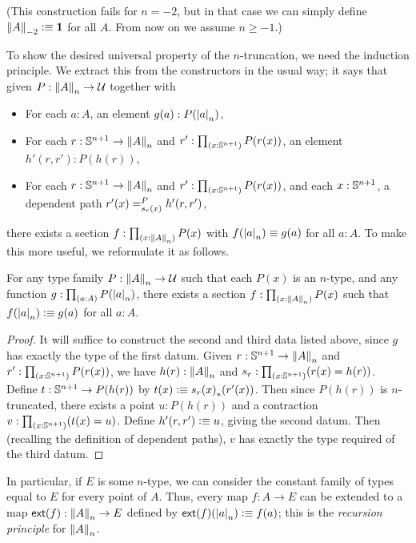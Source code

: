 (This construction fails for $n=-2$, but in that case we can simply define $\trunc{-2}{A}\defeq \unit$ for all $A$.
From now on we assume $n\ge -1$.)

%
To show the desired universal property of the $n$-truncation, we need the induction principle.
We extract this from the constructors in the usual way; it says that given $P:\trunc nA\to\type$ together with
\begin{itemize}
\item For each $a:A$, an element $g(a) : P(\tproj na)$,
\item For each $r:\Sn^{n+1} \to \trunc n A$ and $r':\prd{x:\Sn^{n+1}} P(r(x))$, an element $h'(r,r'):P(h(r))$,
\item For each $r:\Sn^{n+1} \to \trunc n A$ and $r':\prd{x:\Sn^{n+1}} P(r(x))$, and each $x:\Sn^{n+1}$, a dependent path
$\dpath{P}{s_r(x)}{r'(x)}{h'(r,r')}$,
\end{itemize}
there exists a section $f:\prd{x:\trunc n A} P(x)$ with $f(\tproj n a) \jdeq g(a)$ for all $a:A$.
To make this more useful, we reformulate it as follows.

\begin{thm}\label{thm:truncn-ind}
  For any type family $P:\trunc n A \to \type$ such that each $P(x)$ is an $n$-type, and any function $g : \prd{a:A} P(\tproj n a)$, there
exists a section $f:\prd{x:\trunc n A} P(x)$ such that $f(\tproj n a)\defeq g(a)$ for all $a:A$.
\end{thm}
\begin{proof}
  It will suffice to construct the second and third data listed above, since $g$ has exactly the type of the first datum.
  Given $r:\Sn^{n+1} \to \trunc n A$ and $r':\prd{x:\Sn^{n+1}} P(r(x))$, we have $h(r):\trunc n A$ and $s_r :\prd{x:\Sn^{n+1}} (r(x) =
h(r))$.
  Define $t:\Sn^{n+1} \to P(h(r))$ by $t(x) \defeq \trans{s_r(x)}{r'(x)}$.
  Then since $P(h(r))$ is $n$-truncated, there exists a point $u:P(h(r))$ and a contraction $v:\prd{x:\Sn^{n+1}} (t(x) = u)$.
  Define $h'(r,r') \defeq u$, giving the second datum.
  Then (recalling the definition of dependent paths), $v$ has exactly the type required of the third datum.
\end{proof}

In particular, if $E$ is some $n$-type, we can consider the constant family of types equal to $E$ for every point of $A$.
%
Thus, every map $f:A\to{}E$ can be extended to a map $\extend{f}:\trunc nA\to{}E$ defined by $\extend{f}(\tproj na)\defeq f(a)$; this is the \emph{recursion principle} for $\trunc n A$.

